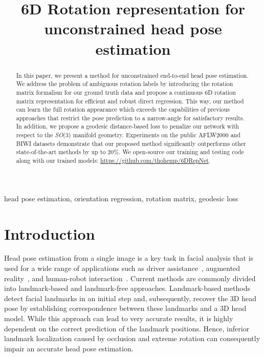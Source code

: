 \documentclass{article}
\title{6D Rotation representation for unconstrained head pose estimation}
\begin{document}
\maketitle
\begin{abstract}
In this paper, we present a method for unconstrained end-to-end head pose estimation. We address the problem of ambiguous rotation labels by introducing the rotation matrix formalism for our ground truth data and propose a continuous 6D rotation matrix representation for efficient and robust direct regression. This way, our method can learn the full rotation appearance which exceeds the capabilities of previous approaches that restrict the pose prediction to a narrow-angle for satisfactory results. In addition, we propose a geodesic distance-based loss to penalize our network with respect to the \textit{SO}(3) manifold geometry. Experiments on the public AFLW2000 and BIWI datasets demonstrate that our proposed method significantly outperforms other state-of-the-art methods by up to 20\%.
We open-source our training and testing code along with our trained models: \url{https://github.com/thohemp/6DRepNet}.
\end{abstract}
\begin{keywords}
head pose estimation, orientation regression, rotation matrix, geodesic loss
\end{keywords}
\section{Introduction}
\label{sec:intro}
Head pose estimation from a single image is a key task in facial analysis that is used for a wide range of applications such as driver assistance~\cite{4357803}, augmented reality~\cite{5443483}, and human-robot interaction~\cite{app11125366}. Current methods are commonly divided into landmark-based and landmark-free approaches. Landmark-based methods~\cite{8297015} detect facial landmarks in an initial step and, subsequently, recover the 3D head pose by establishing correspondence between these landmarks and a 3D head model. While this approach can lead to very accurate results, it is highly dependent on the correct prediction of the landmark positions. Hence, inferior landmark localization caused by occlusion and extreme rotation can consequently impair an accurate head pose estimation. 
\end{document}
